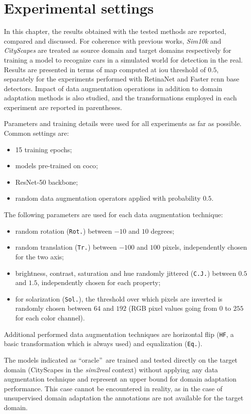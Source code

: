 \documentclass[%
    corpo=12pt,
    twoside,
    stile=classica,   
    tipotesi=magistrale,
    evenboxes,
    english,
	numerazioneromana,
]{toptesi}
\begin{document}
\section{Experimental settings}
In this chapter, the results obtained with the tested methods are reported, compared and discussed. For coherence with previous works, \textit{Sim10k} and \textit{CityScapes} are treated as source domain and target domains respectively for training a model to recognize cars in a simulated world for detection in the real. Results are presented in terms of \gls{map} computed at \gls{iou} threshold of $ 0.5 $, separately for the experiments performed with RetinaNet and Faster \gls{rcnn} base detectors. Impact of data augmentation operations in addition to domain adaptation methods is also studied, and the transformations employed in each experiment are reported in parentheses.

Parameters and training details were used for all experiments as far as possible. Common settings are:
\begin{itemize}
	\item 15 training epochs;
	\item models pre-trained on \gls{coco};
	\item ResNet-50 backbone;
	\item random data augmentation operators applied with probability $ 0.5 $.
\end{itemize}
The following parameters are used for each data augmentation technique:
\begin{itemize}
	\item random rotation (\texttt{Rot.}) between $ -10 $ and $ 10 $ degrees;
	\item random translation (\texttt{Tr.}) between $ -100 $ and $ 100 $ pixels, independently chosen for the two axis;
	\item brightness, contrast, saturation and hue randomly jittered (\texttt{C.J.}) between $ 0.5 $ and $ 1.5 $, independently chosen for each property;
	\item for solarization (\texttt{Sol.}), the threshold over which pixels are inverted is randomly chosen between $ 64 $ and $ 192 $ (RGB pixel values going from $ 0 $ to $ 255 $ for each color channel).
\end{itemize}

Additional performed data augmentation techniques are horizontal flip (\texttt{HF}, a basic transformation which is always used) and equalization (\texttt{Eq.}).

\bigskip
The models indicated as \textquotedblleft oracle\textquotedblright~are trained and tested directly on the target domain (CityScapes in the \textit{sim2real} context) without applying any data augmentation technique and represent an upper bound for domain adaptation performance. This case cannot be encountered in reality, as in the case of unsupervised domain adaptation the annotations are not available for the target domain.
\end{document}
